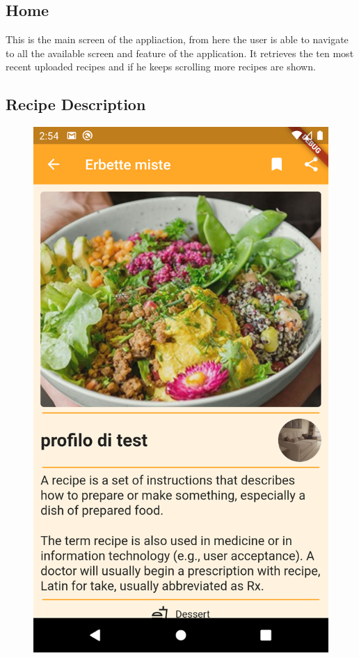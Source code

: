 \subsection{Home}
This is the main screen of the appliaction, from here the user is able to navigate to all the available screen and feature of the application. It retrieves the ten most recent uploaded recipes and if he keeps scrolling more recipes are shown.
\subsection{Recipe Description}
\begin{figure}
	\begin{minipage}{0.48\textwidth}
		\centering
		\includegraphics{img/RecipeView.png}

\end{minipage}
\end{figure}
